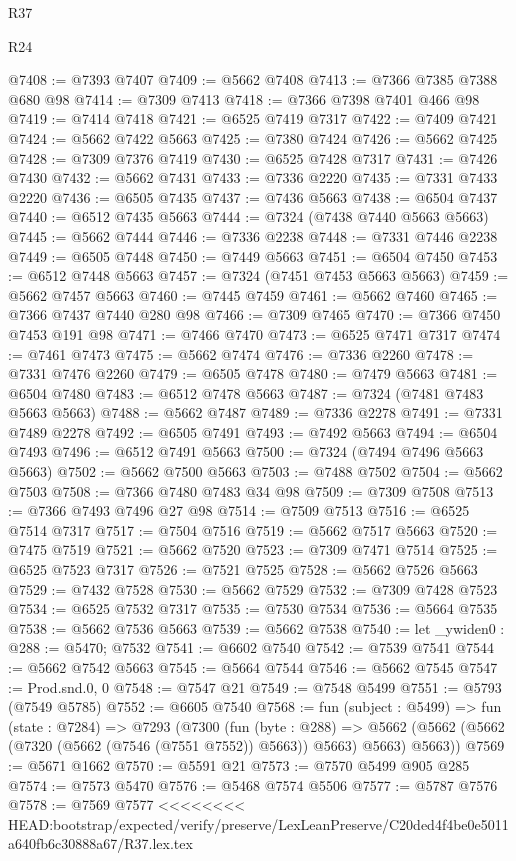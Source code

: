 \begin{lexlean}{R37}
\begin{lexlean}{R24}
\begin{coremodule}
{{{{{{{{{{{{{{{{{{{{{{{{{{{{{{{{{{{{{{{{{{{{{{{{{{{{{{{{{{{{{{{{{{{{{{{{{{{{{{{{{{{{{{{{{{{{{{{{{{{{{{{{{{{{{{{{{{{{{{{{{{{{{{{{{{{{{{{{{{{{{{{{{{{{{{{{{{{{{{{{{{{{{{{{{{{{{{{{{{{{{{{{{@7408 := @7393 @7407
@7409 := @5662 @7408
@7413 := @7366 @7385 @7388 @680 @98
@7414 := @7309 @7413
@7418 := @7366 @7398 @7401 @466 @98
@7419 := @7414 @7418
@7421 := @6525 @7419 @7317
@7422 := @7409 @7421
@7424 := @5662 @7422 @5663
@7425 := @7380 @7424
@7426 := @5662 @7425
@7428 := @7309 @7376 @7419
@7430 := @6525 @7428 @7317
@7431 := @7426 @7430
@7432 := @5662 @7431
@7433 := @7336 @2220
@7435 := @7331 @7433 @2220
@7436 := @6505 @7435
@7437 := @7436 @5663
@7438 := @6504 @7437
@7440 := @6512 @7435 @5663
@7444 := @7324 (@7438 @7440 @5663 @5663)
@7445 := @5662 @7444
@7446 := @7336 @2238
@7448 := @7331 @7446 @2238
@7449 := @6505 @7448
@7450 := @7449 @5663
@7451 := @6504 @7450
@7453 := @6512 @7448 @5663
@7457 := @7324 (@7451 @7453 @5663 @5663)
@7459 := @5662 @7457 @5663
@7460 := @7445 @7459
@7461 := @5662 @7460
@7465 := @7366 @7437 @7440 @280 @98
@7466 := @7309 @7465
@7470 := @7366 @7450 @7453 @191 @98
@7471 := @7466 @7470
@7473 := @6525 @7471 @7317
@7474 := @7461 @7473
@7475 := @5662 @7474
@7476 := @7336 @2260
@7478 := @7331 @7476 @2260
@7479 := @6505 @7478
@7480 := @7479 @5663
@7481 := @6504 @7480
@7483 := @6512 @7478 @5663
@7487 := @7324 (@7481 @7483 @5663 @5663)
@7488 := @5662 @7487
@7489 := @7336 @2278
@7491 := @7331 @7489 @2278
@7492 := @6505 @7491
@7493 := @7492 @5663
@7494 := @6504 @7493
@7496 := @6512 @7491 @5663
@7500 := @7324 (@7494 @7496 @5663 @5663)
@7502 := @5662 @7500 @5663
@7503 := @7488 @7502
@7504 := @5662 @7503
@7508 := @7366 @7480 @7483 @34 @98
@7509 := @7309 @7508
@7513 := @7366 @7493 @7496 @27 @98
@7514 := @7509 @7513
@7516 := @6525 @7514 @7317
@7517 := @7504 @7516
@7519 := @5662 @7517 @5663
@7520 := @7475 @7519
@7521 := @5662 @7520
@7523 := @7309 @7471 @7514
@7525 := @6525 @7523 @7317
@7526 := @7521 @7525
@7528 := @5662 @7526 @5663
@7529 := @7432 @7528
@7530 := @5662 @7529
@7532 := @7309 @7428 @7523
@7534 := @6525 @7532 @7317
@7535 := @7530 @7534
@7536 := @5664 @7535
@7538 := @5662 @7536 @5663
@7539 := @5662 @7538
@7540 := let _ywiden0 : @288 := @5470; @7532
@7541 := @6602 @7540
@7542 := @7539 @7541
@7544 := @5662 @7542 @5663
@7545 := @5664 @7544
@7546 := @5662 @7545
@7547 := Prod.snd.{0, 0}
@7548 := @7547 @21
@7549 := @7548 @5499
@7551 := @5793 (@7549 @5785)
@7552 := @6605 @7540
@7568 := fun (subject : @5499) =>
  fun (state : @7284) =>
  @7293
    (@7300
      (fun (byte : @288) =>
      @5662 (@5662 (@5662 (@7320 (@5662 (@7546 (@7551 @7552)) @5663)) @5663) @5663) @5663))
@7569 := @5671 @1662
@7570 := @5591 @21
@7573 := @7570 @5499 @905 @285
@7574 := @7573 @5470
@7576 := @5468 @7574 @5506
@7577 := @5787 @7576
@7578 := @7569 @7577
<<<<<<<< HEAD:bootstrap/expected/verify/preserve/LexLeanPreserve/C20ded4f4be0e5011a640fb6c30888a67/R37.lex.tex
}}}}}}}}}}}}}}}}}}}}}}}}}}}}}}}}}}}}}}}}}}}}}}}}}}}}}}}}}}}}}}}}}}}}}}}}}}}}}}}}}}}}}}}}}}}}}}}}}}}}}}}}}}}}}}}}}}}}}}}}}}}}}}}}}}}}}}}}}}}}}}}}}}}}}}}}}}}}}}}}}}}}}}}}}}}}}}}}}}}}}}}}}
\end{coremodule}
\end{lexlean}
\end{lexlean}
